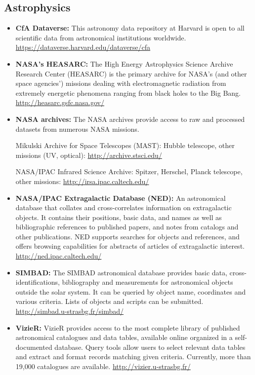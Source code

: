 \subsection{Astrophysics}\label{databases:subsec:astrophysrep}

\begin{itemize}
\item
  \textbf{CfA Dataverse:} This astronomy data repository at Harvard is
  open to all scientific data from astronomical institutions worldwide.
  \url{https://dataverse.harvard.edu/dataverse/cfa}
\item
  \textbf{NASA's HEASARC:} The High Energy Astrophysics Science Archive
  Research Center (HEASARC) is the primary archive for NASA's (and other
  space agencies') missions dealing with electromagnetic radiation from
  extremely energetic phenomena ranging from black holes to the Big
  Bang. \url{http://heasarc.gsfc.nasa.gov/}
\item
  \textbf{NASA archives:} The NASA archives provide access to raw and
  processed datasets from numerous NASA missions.

  Mikulski Archive for Space Telescopes (MAST): Hubble telescope, other
  missions (UV, optical): \url{http://archive.stsci.edu/}

  NASA/IPAC Infrared Science Archive: Spitzer, Herschel, Planck
  telescope, other missions: \url{http://irsa.ipac.caltech.edu/}
\item
  \textbf{NASA/IPAC Extragalactic Database (NED):} An astronomical
  database that collates and cross-correlates information on
  extragalactic objects. It contains their positions, basic data, and
  names as well as bibliographic references to published papers, and
  notes from catalogs and other publications. NED supports searches for
  objects and references, and offers browsing capabilities for abstracts
  of articles of extragalactic interest.
  \url{http://ned.ipac.caltech.edu/}
\item
  \textbf{SIMBAD:} The SIMBAD astronomical database provides basic data,
  cross-identifications, bibliography and measurements for astronomical
  objects outside the solar system. It can be queried by object name,
  coordinates and various criteria. Lists of objects and scripts can be
  submitted. \url{http://simbad.u-strasbg.fr/simbad/}
\item
  \textbf{VizieR:} VizieR provides access to the most complete library
  of published astronomical catalogues and data tables, available online
  organized in a self-documented database. Query tools allow users to
  select relevant data tables and extract and format records matching
  given criteria. Currently, more than 19,000 catalogues are available.
  \url{http://vizier.u-strasbg.fr/}
\end{itemize}

